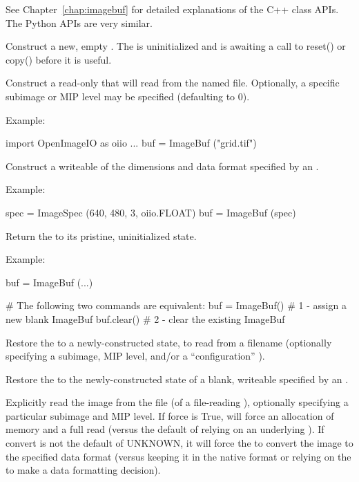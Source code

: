 See Chapter~\ref{chap:imagebuf} for detailed explanations of the
C++ \ImageBuf class APIs. The Python APIs are very similar.

Construct a new, empty \ImageBuf. The \ImageBuf is uninitialized and is
awaiting a call to {\cf reset()} or {\cf copy()} before it is useful.
\apiend


Construct a read-only \ImageBuf that will read from the named file.
Optionally, a specific subimage or MIP level may be specified (defaulting to
0).

\noindent Example:
\begin{code}
    import OpenImageIO as oiio
    ...
    buf = ImageBuf ("grid.tif")
\end{code}
\apiend


Construct a writeable \ImageBuf of the dimensions and data format specified
by an \ImageSpec.

\noindent Example:
\begin{code}
    spec = ImageSpec (640, 480, 3, oiio.FLOAT)
    buf = ImageBuf (spec)
\end{code}
\apiend

Return the \ImageBuf to its pristine, uninitialized state.

\noindent Example:
\begin{code}
    buf = ImageBuf (...)

    # The following two commands are equivalent:
    buf = ImageBuf()     # 1 - assign a new blank ImageBuf
    buf.clear()          # 2 - clear the existing ImageBuf
\end{code}
\apiend

Restore the \ImageBuf to a newly-constructed state, to read from
a filename (optionally specifying a subimage, MIP level, and/or 
a ``configuration'' \ImageSpec).
\apiend

Restore the \ImageBuf to the newly-constructed state of a blank, writeable
\ImageBuf specified by an \ImageSpec.
\apiend

Explicitly read the image from the file (of a file-reading \ImageBuf), optionally
specifying a particular subimage and MIP level.  If {\cf force} is {\cf True},
will force an allocation of memory and a full read (versus the default of
relying on an underlying \ImageCache).  If {\cf convert} is not
the default of {\cf UNKNOWN}, it will force the \ImageBuf to convert the
image to the specified data format (versus keeping it in the native 
format or relying on the \ImageCache to make a data formatting decision).

